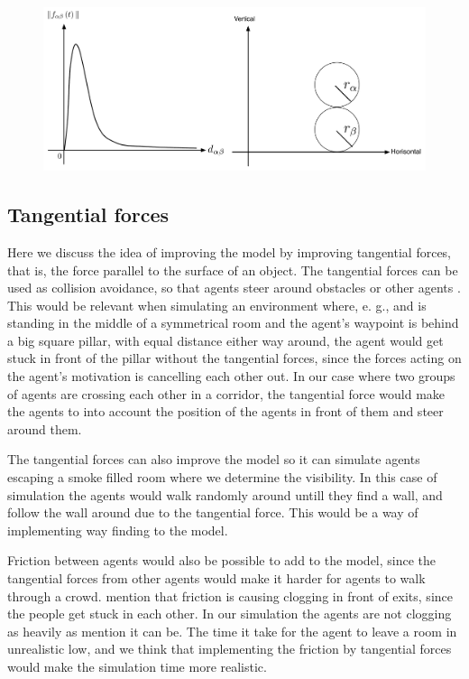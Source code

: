 \begin{figure}[hb]   
\centering
    {\includegraphics[scale=0.35]{Figures/ForceOverlapping.pdf}} 
    \caption{}
    \label{forceoverlapping}
\end{figure}
 
\subsection{Tangential forces}
Here we discuss the idea of improving the model by improving tangential forces, that is, the force parallel to the surface of an object.
The tangential forces can be used as collision avoidance, so that agents steer around obstacles or other agents \cite{tang}.
This would be relevant when simulating an environment where, e. g., and is standing in the middle of a symmetrical room and the agent's waypoint
is behind a big square pillar, with equal distance either way around, the agent would get stuck in front of the pillar without the tangential forces,
since the forces acting on the agent's motivation is cancelling each other out. 
In our case where two groups of agents are crossing each other in a corridor, the tangential force would make the agents to into account
the position of the agents in front of them and steer around them.

The tangential forces can also improve the model so it can simulate agents escaping a smoke filled room where we determine the visibility.
In this case of simulation the agents would walk randomly around untill they find a wall, and follow the wall around due to the tangential force.
This would be a way of implementing way finding to the model.

Friction between agents would also be possible to add to the model, since the tangential forces from other agents would make it
harder for agents to walk through a crowd. \cite{self-org} mention that friction is causing clogging in front of exits, since the people
get stuck in each other. In our simulation the agents are not clogging as heavily as \cite{self-org} mention it can be.
The time it take for the agent to leave a room in unrealistic low, and we think that implementing the friction by tangential forces
would make the simulation time more realistic.
